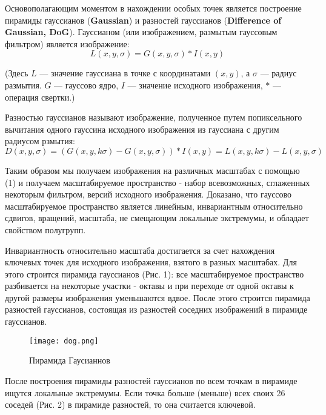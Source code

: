 \tab Основополагающим моментом в нахождении особых точек является построение пирамиды гауссианов (\textbf{Gaussian}) и разностей гауссианов (\textbf{Difference of Gaussian, DoG}). Гауссианом (или изображением, размытым гауссовым фильтром) является изображение:
\begin{equation}
    L(x,y,\sigma) = G(x,y,\sigma) * I(x,y)
\end{equation} 

\begin{footnotesize}
(Здесь $L$ — значение гауссиана в точке с координатами $(x,y)$, а $\sigma$ — радиус размытия. $G$ — гауссово ядро, $I$ — значение исходного изображения, $*$ — операция свертки.)
\end{footnotesize}

\vspace{1em}

Разностью гауссианов называют изображение, полученное путем попиксельного вычитания одного гауссина исходного изображения из гауссиана с другим радиусом рзмытия:
\begin{equation}
    D(x,y,\sigma) = (G(x,y,k\sigma)-G(x,y,\sigma)) * I(x,y) = L(x,y,k\sigma) - L(x,y,\sigma)
\end{equation}

Таким образом мы получаем изображения на различных масштабах с помощью (1) и получаем масштабируемое пространство - набор всевозможных, сглаженных некоторым фильтром, версий исходного изображения. Доказано, что гауссово масштабируемое пространство является линейным, инвариантным относительно сдвигов, вращений, масштаба, не смещающим локальные экстремумы, и обладает свойством полугрупп.

\vspace{1em}

Инвариантность относительно масштаба достигается за счет нахождения ключевых точек для исходного изображения, взятого в разных масштабах. Для этого строится пирамида гауссианов (Рис. 1): все масштабируемое пространство разбивается на некоторые участки - октавы и при переходе от одной октавы к другой размеры изображения уменьшаются вдвое. После этого строится пирамида разностей гауссианов, состоящая из разностей соседних изображений в пирамиде гауссианов.

\begin{figure}[h]
    \centering
    \texttt{[image: dog.png]}
    \caption{Пирамида Гаусианнов}
    \label{fig:dog1}
\end{figure}

После построения пирамиды разностей гауссианов по всем точкам в пирамиде ищутся локальные экстремумы. Если точка больше (меньше) всех своих 26 соседей (Рис. 2) в пирамиде разностей, то она считается ключевой.

